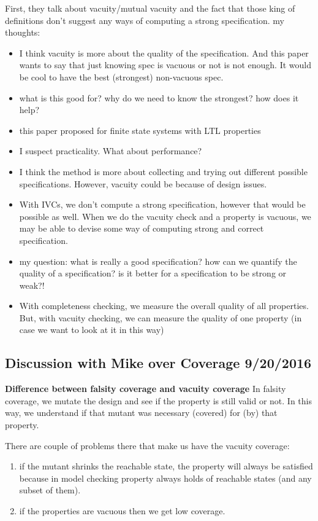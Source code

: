 First, they talk about vacuity/mutual vacuity and the fact that those king of definitions
don't suggest any ways of computing a strong specification.
\linebreak
\linebreak
my thoughts:
\begin{itemize}
  \item I think vacuity is more about the quality of the specification. And this paper wants to
  say that just knowing spec is vacuous or not is not enough. It would be cool to have the best (strongest) non-vacuous spec.
  \item what is this good for? why do we need to know the strongest? how does it help?
  \item this paper proposed for finite state systems with LTL properties
  \item I suspect practicality. What about performance?
  \item I think the method is more about collecting and trying out different possible specifications. However, vacuity could be because of design issues.
  \item With IVCs, we don't compute a strong specification, however that would be possible as well. When we do the vacuity check and a property is vacuous,
      we may be able to devise some way of computing strong and correct specification.
  \item my question: what is really a good specification? how can we quantify the quality of a specification? is it better for a specification to be strong or weak?!
      \item With completeness checking, we measure the overall quality of all properties.
      But, with vacuity checking, we can measure the quality of one property (in case we want to look at it in this way)

\end{itemize}

\subsection{Discussion with Mike over Coverage 9/20/2016}
\textbf{Difference between falsity coverage and vacuity coverage}
In falsity coverage, we mutate the design and see if the property is still valid or not.
In this way, we understand if that mutant was necessary (covered) for (by) that property.

There are couple of problems there that make us have the vacuity coverage:
\begin{enumerate}
  \item if the mutant shrinks the reachable state, the property will always be satisfied because
  in model checking property always holds of reachable states (and any subset of them).
  \item if the properties are vacuous then we get low coverage.
\end{enumerate}

